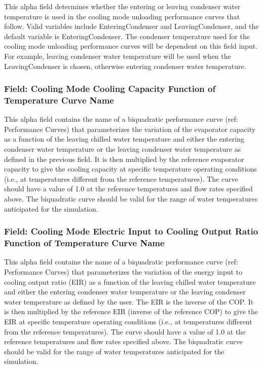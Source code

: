 This alpha field determines whether the entering or leaving condenser water temperature is used in the cooling mode unloading performance curves that follow. Valid variables include EnteringCondenser and LeavingCondenser, and the default variable is EnteringCondenser. The condenser temperature used for the cooling mode unloading performance curves will be dependent on this field input. For example, leaving condenser water temperature will be used when the LeavingCondenser is chosen, otherwise entering condenser water temperature.

\subsubsection{Field: Cooling Mode Cooling Capacity Function of Temperature Curve Name}\label{field-cooling-mode-cooling-capacity-function-of-temperature-curve-name}

This alpha field contains the name of a biquadratic performance curve (ref: Performance Curves) that parameterizes the variation of the evaporator capacity as a function of the leaving chilled water temperature and either the entering condenser water temperature or the leaving condenser water temperature as defined in the previous field. It is then multiplied by the reference evaporator capacity to give the cooling capacity at specific temperature operating conditions (i.e., at temperatures different from the reference temperatures). The curve should have a value of 1.0 at the reference temperatures and flow rates specified above. The biquadratic curve should be valid for the range of water temperatures anticipated for the simulation.

\subsubsection{Field: Cooling Mode Electric Input to Cooling Output Ratio Function of Temperature Curve Name}\label{field-cooling-mode-electric-input-to-cooling-output-ratio-function-of-temperature-curve-name}

This alpha field contains the name of a biquadratic performance curve (ref: Performance Curves) that parameterizes the variation of the energy input to cooling output ratio (EIR) as a function of the leaving chilled water temperature and either the entering condenser water temperature or the leaving condenser water temperature as defined by the user. The EIR is the inverse of the COP. It is then multiplied by the reference EIR (inverse of the reference COP) to give the EIR at specific temperature operating conditions (i.e., at temperatures different from the reference temperatures). The curve should have a value of 1.0 at the reference temperatures and flow rates specified above. The biquadratic curve should be valid for the range of water temperatures anticipated for the simulation.

